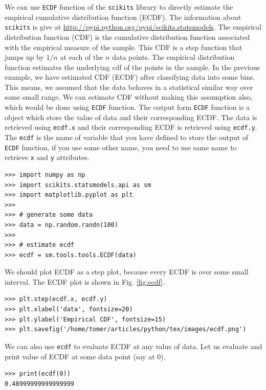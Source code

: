 \documentclass[10pt]{book}
\begin{document}
{We can use \verb"ECDF" function of the \verb"scikits" library to directly estimate the empirical cumulative distribution function (ECDF). The information about \verb"scikits" is give at \url{http://pypi.python.org/pypi/scikits.statsmodels}. The empirical distribution function (CDF) is the cumulative distribution function associated with the empirical measure of the sample. This CDF is a step function that jumps up by $1/n$ at each of the $n$ data points. The empirical distribution function estimates the underlying cdf of the points in the sample. In the previous example, we have estimated CDF (ECDF) after classifying data into some bins. This means, we assumed that the data behaves in a statistical similar way over some small range. We can estimate CDF without making this assumption also, which would be done using \verb"ECDF" function. The output form \verb"ECDF" function is a object which store the value of data and their corresponding ECDF. The data is retrieved using \verb"ecdf.x" and their corresponding 
ECDF is retrieved using \verb"ecdf.y". The \verb"ecdf" is the name of variable that you have defined to store the output of \verb"ECDF" function, if you use some other name, you need to use same name to retrieve \verb"x" and \verb"y" attributes. 
\beforeverb \begin{verbatim}
>>> import numpy as np
>>> import scikits.statsmodels.api as sm
>>> import matplotlib.pyplot as plt
>>> 
>>> # generate some data
>>> data = np.random.randn(100)
>>> 
>>> # estimate ecdf
>>> ecdf = sm.tools.tools.ECDF(data)
\end{verbatim} \afterverb

We should plot ECDF as a step plot, because every ECDF is over some small interval. The ECDF plot is shown in Fig. \ref{fig:ecdf}. 
\beforeverb \begin{verbatim}
>>> plt.step(ecdf.x, ecdf.y)
>>> plt.xlabel('data', fontsize=20)
>>> plt.ylabel('Empirical CDF', fontsize=15)
>>> plt.savefig('/home/tomer/articles/python/tex/images/ecdf.png')
\end{verbatim} \afterverb

We can also use \verb"ecdf" to evaluate ECDF at any value of data. Let us evaluate and print value of ECDF at some data point (say at 0).
\beforeverb \begin{verbatim}
>>> print(ecdf(0))
0.48999999999999999
\end{verbatim} \afterverb

}
\end{document}
